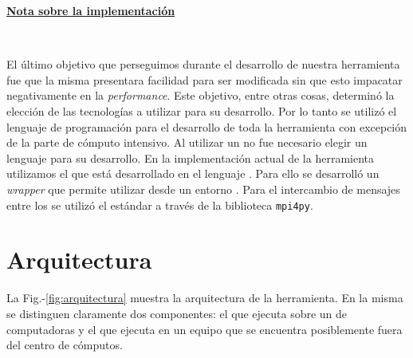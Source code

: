 \noindent\underline{\textbf{Nota sobre la implementación}}

\

El último objetivo que perseguimos durante el desarrollo de nuestra
herramienta fue que la misma presentara facilidad para ser modificada sin que
esto impacatar negativamente en la \emph{performance}. Este objetivo, entre
otras cosas, determinó la elección de las tecnologías a utilizar para su
desarrollo. Por lo tanto se utilizó el lenguaje de programación \Python para
el desarrollo de toda la herramienta con excepción de la parte de cómputo
intensivo. Al utilizar un \ssolver \ots no fue necesario elegir un lenguaje
para su desarrollo. En la implementación actual de la herramienta utilizamos
el \ssolver \minisatdosveinte que está desarrollado en el lenguaje \cpp. Para
ello se desarrolló un \emph{wrapper} que permite utilizar \minisat desde un
entorno \Python. Para el intercambio de mensajes entre los \ws se utilizó el
estándar \mpi a través de la biblioteca \texttt{mpi4py}\cite{mpi4py}.



\section{Arquitectura}

\newcommand{\fig}{Fig.-}

La \fig\ref{fig:arquitectura} muestra la arquitectura de la herramienta. En
la misma se distinguen claramente dos componentes: el \bend que ejecuta sobre
un \cluster de computadoras y el \fend que ejecuta en un equipo que se
encuentra posiblemente fuera del centro de cómputos.

